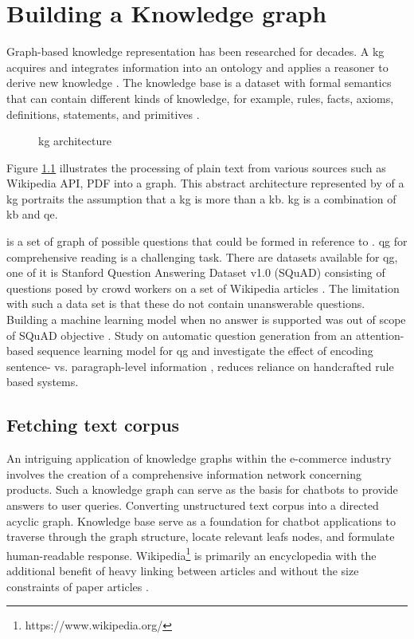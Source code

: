 \chapter{Building a Knowledge graph} \label{sec:building-kg}

Graph-based knowledge representation has been researched for decades.
A \acf{kg} acquires and integrates information into an ontology and applies a reasoner to derive new knowledge \parencite{LisaEhrlinger}.
The knowledge base is a dataset with formal semantics that can contain different kinds of knowledge, for example, rules, facts, axioms, definitions, statements, and primitives \parencite{Davies.2008cop.2006}.

\begin{figure}[h!]
    \centering
    
    \caption{\acl{kg} architecture}
    \label{fig:kg}
    \parencite[Chapter 4]{LisaEhrlinger}
\end{figure}

Figure \ref{fig:kg} illustrates the processing of plain text from various sources such as  Wikipedia API, PDF into a graph. This abstract architecture represented by  of a \acl{kg} portraits the assumption that a \acl{kg} is more than a \acf{kb}. \acl{kg} is a combination of \acl{kb} and \acf{qe}. 

 is a set of graph of possible questions that could be formed in reference to . \acf{qg} for comprehensive reading is a challenging task. There are datasets available for  \acs{qg}, one of it is Stanford Question Answering Dataset v1.0 (SQuAD) consisting of questions posed by crowd workers on a set of Wikipedia articles \parencite{PranavRajpurkar.}. The limitation with such a data set is that these do not contain unanswerable questions. Building a machine learning model when no answer is supported was out of scope of SQuAD objective \parencite{LupeHernandez}.  Study on automatic question generation from an attention-based sequence learning model \parencite{Vaswani.12062017} for  \ac{qg} and investigate the effect of encoding sentence- vs. paragraph-level information \parencite{DuXinya.29042017}, reduces reliance on handcrafted rule based systems.

\clearpage

\section{Fetching text corpus}


An intriguing application of knowledge graphs within the e-commerce industry involves the creation of a comprehensive information network concerning products. Such a knowledge graph can serve as the basis for chatbots to provide answers to user queries. Converting unstructured text corpus into a directed acyclic graph. Knowledge base serve as a foundation for chatbot applications to traverse through the graph structure, locate relevant leafs nodes, and formulate human-readable response. Wikipedia\footnote{https://www.wikipedia.org/} is primarily an encyclopedia with the additional benefit of heavy linking between articles and without the size constraints of paper articles \parencite{TorstenZesch}. 

